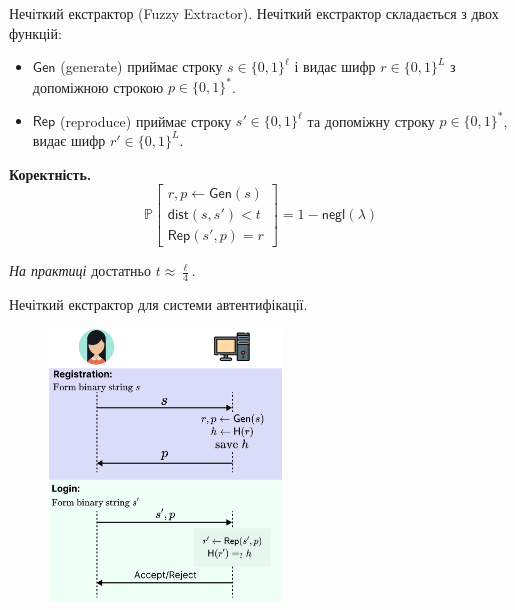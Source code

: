 \documentclass[xcolor={usenames,dvipsnames}]{beamer}
\begin{document}
    \begin{frame}{Нечіткий екстрактор (Fuzzy Extractor).}
        Нечіткий екстрактор складається з двох функцій:
        \begin{itemize}
            \item $\mathsf{Gen}$ (generate) приймає строку $s \in \{0,1\}^{\ell}$ і видає шифр $r \in \{0,1\}^L$ з допоміжною строкою $p \in \{0,1\}^*$.
            \item $\mathsf{Rep}$ (reproduce) приймає строку $s' \in \{0,1\}^{\ell}$ та допоміжну строку $p \in \{0,1\}^*$, видає шифр $r' \in \{0,1\}^L$.
        \end{itemize}

        \textbf{Коректність.}
        \begin{equation*}
            \mathbb{P}\begin{bmatrix}
                r,p \gets \mathsf{Gen}(s) \\
                \mathsf{dist}(s,s') < t \\
                \mathsf{Rep}(s',p) = r
            \end{bmatrix} = 1 - \mathsf{negl}(\lambda)
        \end{equation*}

        \textit{На практиці} достатньо $t \approx \frac{\ell}{4}$.
    \end{frame}

    \begin{frame}{Нечіткий екстрактор для системи автентифікації.}
        \begin{figure}
        \centering
            \includegraphics[width=0.55\textwidth]{images/fuzzy_auth.png}
        \end{figure}
    \end{frame}
\end{document}
